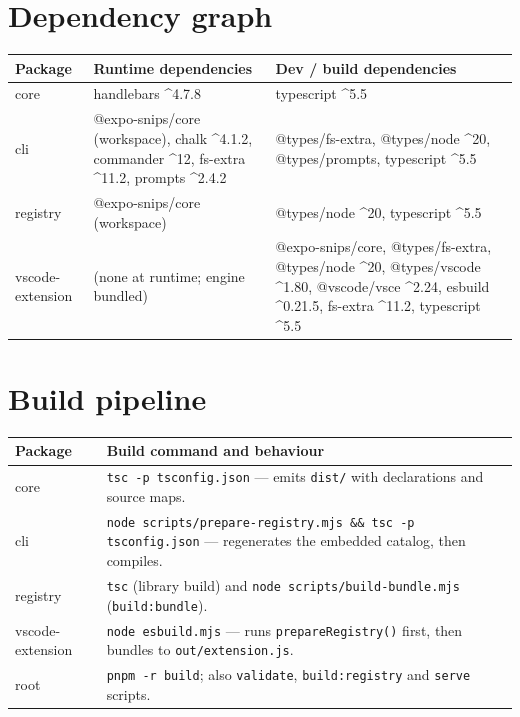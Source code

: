\section{Dependency graph}

\begin{table}[H]
\centering
\caption{Runtime and build dependencies}
\begin{longtable}{@{}L{3.6cm}L{4.6cm}L{5.8cm}@{}}
\toprule
\textbf{Package} & \textbf{Runtime dependencies} & \textbf{Dev / build dependencies} \\
\midrule
\endhead
core & handlebars \^{}4.7.8 & typescript \^{}5.5 \\
cli & @expo-snips/core (workspace), chalk \^{}4.1.2, commander \^{}12, fs-extra \^{}11.2, prompts \^{}2.4.2 & @types/fs-extra, @types/node \^{}20, @types/prompts, typescript \^{}5.5 \\
registry & @expo-snips/core (workspace) & @types/node \^{}20, typescript \^{}5.5 \\
vscode-extension & (none at runtime; engine bundled) & @expo-snips/core, @types/fs-extra, @types/node \^{}20, @types/vscode \^{}1.80, @vscode/vsce \^{}2.24, esbuild \^{}0.21.5, fs-extra \^{}11.2, typescript \^{}5.5 \\
\bottomrule
\end{longtable}
\end{table}

\section{Build pipeline}

\begin{longtable}{@{}L{4cm}L{10cm}@{}}
\toprule
\textbf{Package} & \textbf{Build command and behaviour} \\
\midrule
\endhead
core & \texttt{tsc -p tsconfig.json} --- emits \texttt{dist/} with declarations and source maps. \\
cli & \texttt{node scripts/prepare-registry.mjs \&\& tsc -p tsconfig.json} --- regenerates the embedded catalog, then compiles. \\
registry & \texttt{tsc} (library build) and \texttt{node scripts/build-bundle.mjs} (\texttt{build:bundle}). \\
vscode-extension & \texttt{node esbuild.mjs} --- runs \texttt{prepareRegistry()} first, then bundles to \texttt{out/extension.js}. \\
root & \texttt{pnpm -r build}; also \texttt{validate}, \texttt{build:registry} and \texttt{serve} scripts. \\
\bottomrule
\end{longtable}

